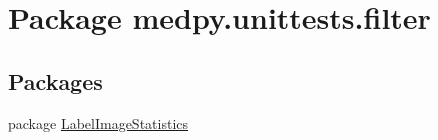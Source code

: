 \hypertarget{namespacemedpy_1_1unittests_1_1filter}{
\section{Package medpy.unittests.filter}
\label{namespacemedpy_1_1unittests_1_1filter}
}
\subsection*{Packages}
\begin{DoxyCompactItemize}
\item 
package \hyperlink{namespacemedpy_1_1unittests_1_1filter_1_1LabelImageStatistics}{LabelImageStatistics}
\end{DoxyCompactItemize}
